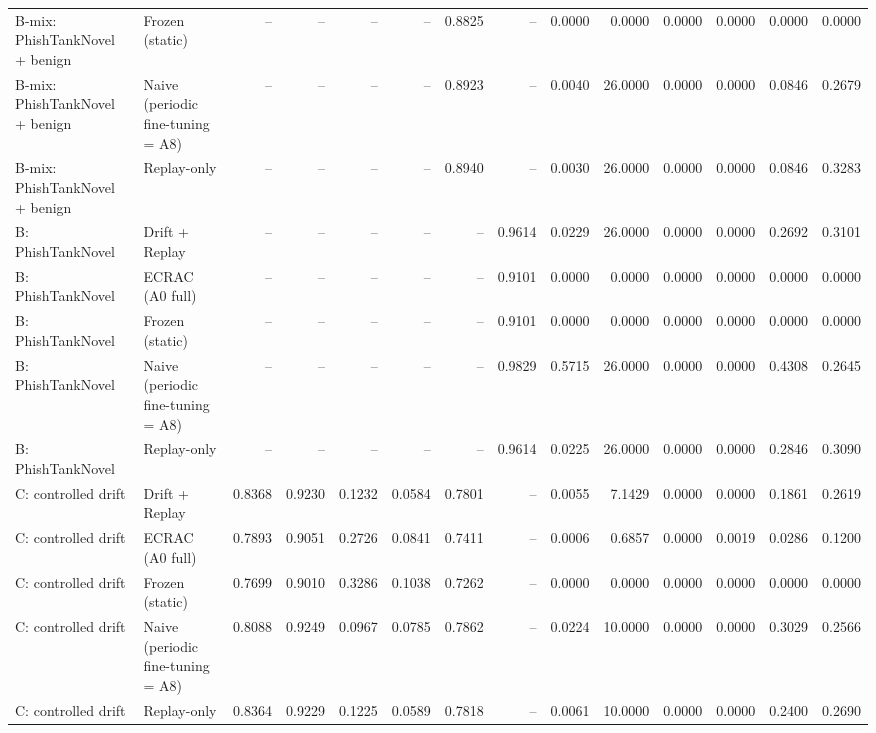 \begin{table}[t]
\begin{tabular}{llrrrrrrrrrrrr}
B-mix: PhishTankNovel + benign & Frozen (static) & -- & -- & -- & -- & 0.8825 & -- & 0.0000 & 0.0000 & 0.0000 & 0.0000 & 0.0000 & 0.0000 \\
B-mix: PhishTankNovel + benign & Naive (periodic fine-tuning = A8) & -- & -- & -- & -- & 0.8923 & -- & 0.0040 & 26.0000 & 0.0000 & 0.0000 & 0.0846 & 0.2679 \\
B-mix: PhishTankNovel + benign & Replay-only & -- & -- & -- & -- & 0.8940 & -- & 0.0030 & 26.0000 & 0.0000 & 0.0000 & 0.0846 & 0.3283 \\
B: PhishTankNovel & Drift + Replay & -- & -- & -- & -- & -- & 0.9614 & 0.0229 & 26.0000 & 0.0000 & 0.0000 & 0.2692 & 0.3101 \\
B: PhishTankNovel & ECRAC (A0 full) & -- & -- & -- & -- & -- & 0.9101 & 0.0000 & 0.0000 & 0.0000 & 0.0000 & 0.0000 & 0.0000 \\
B: PhishTankNovel & Frozen (static) & -- & -- & -- & -- & -- & 0.9101 & 0.0000 & 0.0000 & 0.0000 & 0.0000 & 0.0000 & 0.0000 \\
B: PhishTankNovel & Naive (periodic fine-tuning = A8) & -- & -- & -- & -- & -- & 0.9829 & 0.5715 & 26.0000 & 0.0000 & 0.0000 & 0.4308 & 0.2645 \\
B: PhishTankNovel & Replay-only & -- & -- & -- & -- & -- & 0.9614 & 0.0225 & 26.0000 & 0.0000 & 0.0000 & 0.2846 & 0.3090 \\
C: controlled drift & Drift + Replay & 0.8368 & 0.9230 & 0.1232 & 0.0584 & 0.7801 & -- & 0.0055 & 7.1429 & 0.0000 & 0.0000 & 0.1861 & 0.2619 \\
C: controlled drift & ECRAC (A0 full) & 0.7893 & 0.9051 & 0.2726 & 0.0841 & 0.7411 & -- & 0.0006 & 0.6857 & 0.0000 & 0.0019 & 0.0286 & 0.1200 \\
C: controlled drift & Frozen (static) & 0.7699 & 0.9010 & 0.3286 & 0.1038 & 0.7262 & -- & 0.0000 & 0.0000 & 0.0000 & 0.0000 & 0.0000 & 0.0000 \\
C: controlled drift & Naive (periodic fine-tuning = A8) & 0.8088 & 0.9249 & 0.0967 & 0.0785 & 0.7862 & -- & 0.0224 & 10.0000 & 0.0000 & 0.0000 & 0.3029 & 0.2566 \\
C: controlled drift & Replay-only & 0.8364 & 0.9229 & 0.1225 & 0.0589 & 0.7818 & -- & 0.0061 & 10.0000 & 0.0000 & 0.0000 & 0.2400 & 0.2690 \\
\bottomrule
\end{tabular}
\end{table}